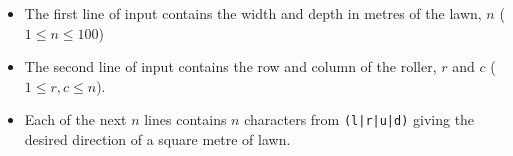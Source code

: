 

\begin{itemize}
  \item The first line of input contains the width and depth in metres of the lawn, $n$ ($1 \le n \le 100$)

  \item The second line of input contains the row and column of the roller, $r$ and $c$ ($1 \le r, c \le n$).

  \item Each of the next $n$ lines contains $n$ characters from \texttt{(l|r|u|d)} giving the desired
        direction of a square metre of lawn.
\end{itemize}

